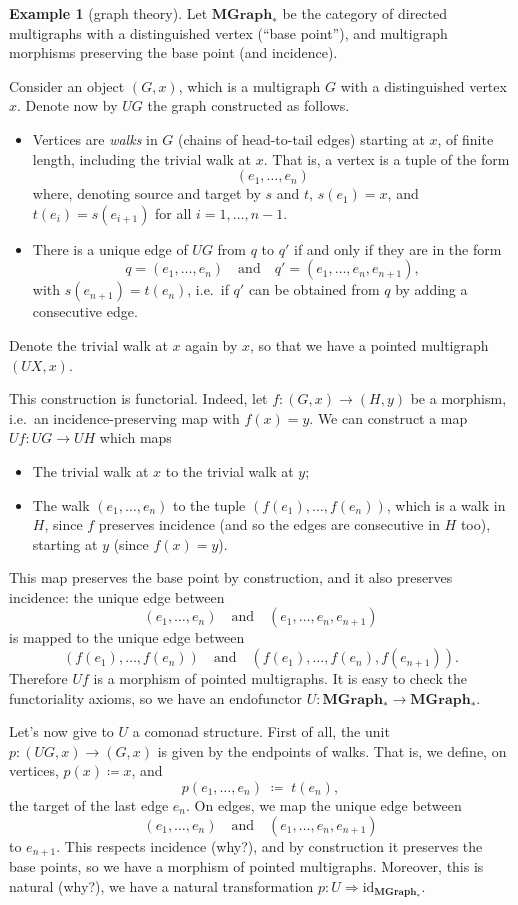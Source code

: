 \documentclass[12pt,oneside]{scrbook}
\numberwithin{equation}{section}
\theoremstyle{plain}
\theoremstyle{definition}
\newtheorem{eg}[thm]{Example}
\newcommand{\cat}[1]{{\mathbf{#1}}} %
\DeclareMathOperator{\1}{\mathbbm{1}}
\DeclareMathOperator{\2}{\mathbbm{2}}
\newcommand{\id}{\mathrm{id}} %
\begin{document}
\begin{eg}[graph theory]\label{ucgraphs}
 Let $\cat{MGraph}_*$ be the category of directed multigraphs with a distinguished vertex (``base point''), and multigraph morphisms preserving the base point (and incidence). 
 
 Consider an object $(G,x)$, which is a multigraph $G$ with a distinguished vertex $x$. Denote now by $UG$ the graph constructed as follows.
 \begin{itemize}
  \item Vertices are \emph{walks} in $G$ (chains of head-to-tail edges) starting at $x$, of finite length, including the trivial walk at $x$. That is, a vertex is a tuple of the form
  $$
  (e_1,\dots,e_n)
  $$
  where, denoting source and target by $s$ and $t$, $s(e_1)=x$, and $t(e_i)=s(e_{i+1})$ for all $i=1,\dots,n-1$.
  \item There is a unique edge of $UG$ from $q$ to $q'$ if and only if they are in the form 
  $$
  q=(e_1,\dots,e_n) \quad\mbox{and}\quad q'=(e_1,\dots,e_n,e_{n+1}) ,
  $$
  with $s(e_{n+1})=t(e_n)$,
  i.e.~if $q'$ can be obtained from $q$ by adding a consecutive edge. 
 \end{itemize}
 Denote the trivial walk at $x$ again by $x$, so that we have a pointed multigraph $(UX,x)$. 
 
 This construction is functorial. Indeed, let $f:(G,x)\to (H,y)$ be a morphism, i.e.~an incidence-preserving map with $f(x)=y$. We can construct a map $Uf:UG\to UH$ which maps 
 \begin{itemize}
  \item The trivial walk at $x$ to the trivial walk at $y$;
  \item The walk $(e_1,\dots,e_n)$ to the tuple $(f(e_1),\dots,f(e_n))$, which is a walk in $H$, since $f$ preserves incidence (and so the edges are consecutive in $H$ too), starting at $y$ (since $f(x)=y$). 
 \end{itemize}
 This map preserves the base point by construction, and it also preserves incidence: the unique edge between
 $$
 (e_1,\dots,e_n) \quad\mbox{and}\quad (e_1,\dots,e_n,e_{n+1})
 $$
 is mapped to the unique edge between
 $$
 (f(e_1),\dots,f(e_n)) \quad\mbox{and}\quad (f(e_1),\dots,f(e_n),f(e_{n+1})) .
 $$
 Therefore $Uf$ is a morphism of pointed multigraphs.
 It is easy to check the functoriality axioms, so we have an endofunctor $U:\cat{MGraph}_*\to\cat{MGraph}_*$. 

 Let's now give to $U$ a comonad structure. First of all, the unit $p:(UG,x)\to(G,x)$ is given by the endpoints of walks. That is, we define, on vertices, $p(x)\coloneqq x$, and
 $$
 p(e_1,\dots,e_n) \;\coloneqq\; t(e_n),
 $$
 the target of the last edge $e_n$. On edges, we map the unique edge between
 $$
 (e_1,\dots,e_n) \quad\mbox{and}\quad (e_1,\dots,e_n,e_{n+1})
 $$
 to $e_{n+1}$. This respects incidence (why?), and by construction it preserves the base points, so we have a morphism of pointed multigraphs. Moreover, this is natural (why?), we have a natural transformation $p:U\Rightarrow \id_{\cat{MGraph}_*}$. 
 

\end{eg}
\end{document}

